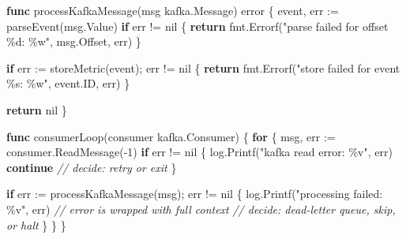 \documentclass[
]{article}
\newenvironment{Shaded}{}{}
\newcommand{\CommentTok}[1]{\textcolor[rgb]{0.38,0.63,0.69}{\textit{#1}}}
\newcommand{\ControlFlowTok}[1]{\textcolor[rgb]{0.00,0.44,0.13}{\textbf{#1}}}
\newcommand{\DataTypeTok}[1]{\textcolor[rgb]{0.56,0.13,0.00}{#1}}
\newcommand{\DecValTok}[1]{\textcolor[rgb]{0.25,0.63,0.44}{#1}}
\newcommand{\KeywordTok}[1]{\textcolor[rgb]{0.00,0.44,0.13}{\textbf{#1}}}
\newcommand{\NormalTok}[1]{#1}
\newcommand{\OperatorTok}[1]{\textcolor[rgb]{0.40,0.40,0.40}{#1}}
\newcommand{\OtherTok}[1]{\textcolor[rgb]{0.00,0.44,0.13}{#1}}
\newcommand{\StringTok}[1]{\textcolor[rgb]{0.25,0.44,0.63}{#1}}
\begin{document}
\begin{Shaded}
\begin{Highlighting}[]
\KeywordTok{func}\NormalTok{ processKafkaMessage}\OperatorTok{(}\NormalTok{msg kafka}\OperatorTok{.}\NormalTok{Message}\OperatorTok{)} \DataTypeTok{error} \OperatorTok{\{}
\NormalTok{    event}\OperatorTok{,}\NormalTok{ err }\OperatorTok{:=}\NormalTok{ parseEvent}\OperatorTok{(}\NormalTok{msg}\OperatorTok{.}\NormalTok{Value}\OperatorTok{)}
    \ControlFlowTok{if}\NormalTok{ err }\OperatorTok{!=} \OtherTok{nil} \OperatorTok{\{}
        \ControlFlowTok{return}\NormalTok{ fmt}\OperatorTok{.}\NormalTok{Errorf}\OperatorTok{(}\StringTok{"parse failed for offset \%d: \%w"}\OperatorTok{,}\NormalTok{ msg}\OperatorTok{.}\NormalTok{Offset}\OperatorTok{,}\NormalTok{ err}\OperatorTok{)}
    \OperatorTok{\}}

    \ControlFlowTok{if}\NormalTok{ err }\OperatorTok{:=}\NormalTok{ storeMetric}\OperatorTok{(}\NormalTok{event}\OperatorTok{);}\NormalTok{ err }\OperatorTok{!=} \OtherTok{nil} \OperatorTok{\{}
        \ControlFlowTok{return}\NormalTok{ fmt}\OperatorTok{.}\NormalTok{Errorf}\OperatorTok{(}\StringTok{"store failed for event \%s: \%w"}\OperatorTok{,}\NormalTok{ event}\OperatorTok{.}\NormalTok{ID}\OperatorTok{,}\NormalTok{ err}\OperatorTok{)}
    \OperatorTok{\}}

    \ControlFlowTok{return} \OtherTok{nil}
\OperatorTok{\}}

\KeywordTok{func}\NormalTok{ consumerLoop}\OperatorTok{(}\NormalTok{consumer kafka}\OperatorTok{.}\NormalTok{Consumer}\OperatorTok{)} \OperatorTok{\{}
    \ControlFlowTok{for} \OperatorTok{\{}
\NormalTok{        msg}\OperatorTok{,}\NormalTok{ err }\OperatorTok{:=}\NormalTok{ consumer}\OperatorTok{.}\NormalTok{ReadMessage}\OperatorTok{({-}}\DecValTok{1}\OperatorTok{)}
        \ControlFlowTok{if}\NormalTok{ err }\OperatorTok{!=} \OtherTok{nil} \OperatorTok{\{}
\NormalTok{            log}\OperatorTok{.}\NormalTok{Printf}\OperatorTok{(}\StringTok{"kafka read error: \%v"}\OperatorTok{,}\NormalTok{ err}\OperatorTok{)}
            \ControlFlowTok{continue} \CommentTok{// decide: retry or exit}
        \OperatorTok{\}}

        \ControlFlowTok{if}\NormalTok{ err }\OperatorTok{:=}\NormalTok{ processKafkaMessage}\OperatorTok{(}\NormalTok{msg}\OperatorTok{);}\NormalTok{ err }\OperatorTok{!=} \OtherTok{nil} \OperatorTok{\{}
\NormalTok{            log}\OperatorTok{.}\NormalTok{Printf}\OperatorTok{(}\StringTok{"processing failed: \%v"}\OperatorTok{,}\NormalTok{ err}\OperatorTok{)} \CommentTok{// error is wrapped with full context}
            \CommentTok{// decide: dead{-}letter queue, skip, or halt}
        \OperatorTok{\}}
    \OperatorTok{\}}
\OperatorTok{\}}
\end{Highlighting}
\end{Shaded}
\end{document}
